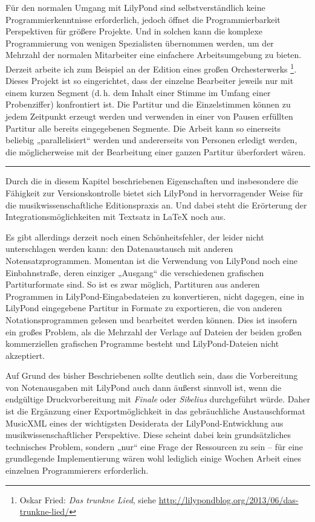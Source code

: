 \documentclass[DIV=12]{scrreprt}
\begin{document}
Für den normalen Umgang mit LilyPond sind selbstverständlich keine Programmierkenntnisse erforderlich, jedoch öffnet die Programmierbarkeit Perspektiven für größere Projekte.
Und in solchen kann die komplexe Programmierung von wenigen Spezialisten übernommen werden, um der Mehrzahl der normalen Mitarbeiter eine einfachere Arbeitsumgebung zu bieten.
Derzeit arbeite ich zum Beispiel an der Edition eines großen Orchesterwerks%
\footnote{Oskar Fried: \emph{Das trunkne Lied}, siehe \url{http://lilypondblog.org/2013/06/das-trunkne-lied/}}.
Dieses Projekt ist so eingerichtet, dass der einzelne Bearbeiter jeweils nur mit einem kurzen Segment (d.\,h. dem Inhalt einer Stimme im Umfang einer Probenziffer) konfrontiert ist.
Die Partitur und die Einzelstimmen können zu jedem Zeitpunkt erzeugt werden und verwenden in einer von Pausen erfüllten Partitur alle bereits eingegebenen Segmente.
Die Arbeit kann so einerseits beliebig „parallelisiert“ werden und andererseits von Personen erledigt werden, die möglicherweise mit der Bearbeitung einer ganzen Partitur überfordert wären.

\bigskip
\hrule
\bigskip

Durch die in diesem Kapitel beschriebenen Eigenschaften und insbesondere die Fähigkeit zur Versionskontrolle bietet sich LilyPond in hervorragender Weise für die musikwissenschaftliche Editionspraxis an.
Und dabei steht die Erörterung der Integrationsmöglichkeiten mit Textsatz in \LaTeX{} noch aus.

\bigskip
Es gibt allerdings derzeit noch einen Schönheitsfehler, der leider nicht unterschlagen werden kann: den Datenaustausch mit anderen Notensatzprogrammen.
Momentan ist die Verwendung von LilyPond noch eine Einbahnstraße, deren einziger „Ausgang“ die verschiedenen grafischen Partiturformate sind.
So ist es zwar möglich, Partituren aus anderen Programmen in LilyPond-Eingabedateien zu konvertieren, nicht dagegen, eine in LilyPond eingegebene Partitur in Formate zu exportieren, die von anderen Notationsprogrammen gelesen und bearbeitet werden können.
Dies ist insofern ein großes Problem, als die Mehrzahl der Verlage auf Dateien der beiden großen kommerziellen grafischen Programme besteht und LilyPond-Dateien nicht akzeptiert.

Auf Grund des bisher Beschriebenen sollte deutlich sein, dass die Vorbereitung von Notenausgaben mit LilyPond auch dann äußerst sinnvoll ist, wenn die endgültige Druckvorbereitung mit \emph{Finale} oder \emph{Sibelius} durchgeführt würde.
Daher ist die Ergänzung einer Exportmöglichkeit in das gebräuchliche Austauschformat MusicXML eines der wichtigsten Desiderata der LilyPond-Entwicklung aus musikwissenschaftlicher Perspektive.
Diese scheint dabei kein grundsätzliches technisches Problem, sondern „nur“ eine Frage der Ressourcen zu sein -- für eine grundlegende Implementierung wären wohl lediglich einige Wochen Arbeit eines einzelnen Programmierers erforderlich.
\end{document}
